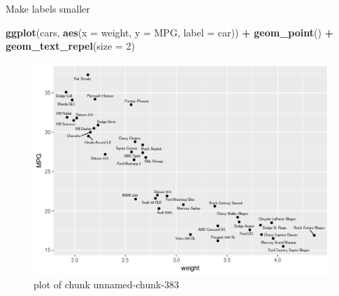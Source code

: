 \documentclass[ignorenonframetext,]{beamer}
\newenvironment{Shaded}{\begin{snugshade}}{\end{snugshade}}
\newcommand{\DataTypeTok}[1]{\textcolor[rgb]{0.13,0.29,0.53}{#1}}
\newcommand{\DecValTok}[1]{\textcolor[rgb]{0.00,0.00,0.81}{#1}}
\newcommand{\KeywordTok}[1]{\textcolor[rgb]{0.13,0.29,0.53}{\textbf{#1}}}
\newcommand{\NormalTok}[1]{#1}
\newcommand{\OperatorTok}[1]{\textcolor[rgb]{0.81,0.36,0.00}{\textbf{#1}}}
\newcommand{\StringTok}[1]{\textcolor[rgb]{0.31,0.60,0.02}{#1}}
\begin{document}
\begin{frame}[fragile]{Make labels smaller}
\protect\hypertarget{make-labels-smaller}{}

\begin{Shaded}
\begin{Highlighting}[]
\KeywordTok{ggplot}\NormalTok{(cars, }\KeywordTok{aes}\NormalTok{(}\DataTypeTok{x =}\NormalTok{ weight, }\DataTypeTok{y =}\NormalTok{ MPG, }\DataTypeTok{label =}\NormalTok{ car)) }\OperatorTok{+}
\StringTok{  }\KeywordTok{geom_point}\NormalTok{() }\OperatorTok{+}\StringTok{ }\KeywordTok{geom_text_repel}\NormalTok{(}\DataTypeTok{size =} \DecValTok{2}\NormalTok{)}
\end{Highlighting}
\end{Shaded}

\begin{figure}
\centering
\includegraphics{figure/unnamed-chunk-383-1.png}
\caption{plot of chunk unnamed-chunk-383}
\end{figure}

\end{frame}
\end{document}

